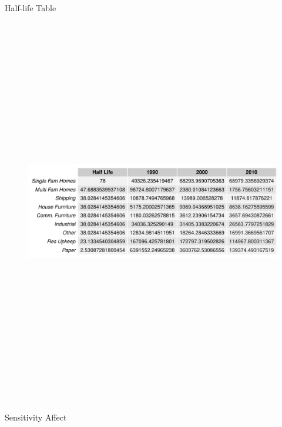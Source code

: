 \documentclass[final]{beamer}\usepackage[]{graphicx}\usepackage[]{color}
\newlength{\onecolwid}
\newlength{\twocolwid}
\begin{document}
\begin{frame}[t]
\begin{columns}[t]
\begin{column}{\twocolwid}
\begin{columns}[t,totalwidth=\twocolwid]
\begin{column}{\onecolwid}

\begin{block}{Half-life Table}
\begin{center}

\begin{figure}
    {\includegraphics[width=1\linewidth, height = 17cm]{CopyOfHLTable.pdf}}
    
\end{figure}
\end{center}
\end{block}






\begin{block}{Sensitivity Affect}
\begin{center}


\end{center}
\end{block}
\end{column}
\end{columns}
\end{column}
\end{columns}
\end{frame}
\end{document}
